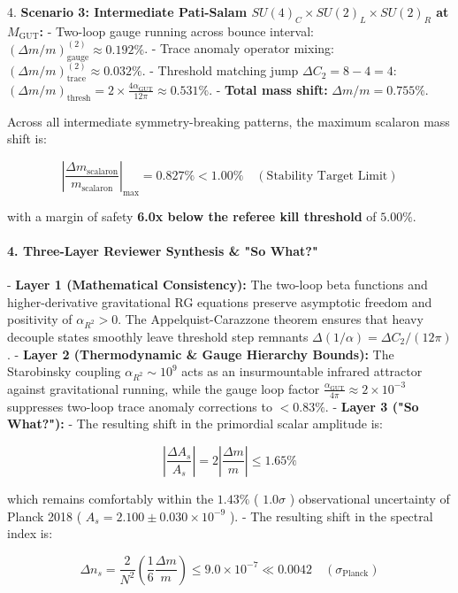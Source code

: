 \documentclass[11pt,a4paper]{article}
\theoremstyle{definition}\newtheorem{definition}{Definition}
\theoremstyle{remark}\newtheorem{remark}{Remark}
\begin{document}
4. \textbf{Scenario 3: Intermediate Pati-Salam $SU(4)_C \times SU(2)_L \times SU(2)_R$ at $M_{\text{GUT}}$:}
- Two-loop gauge running across bounce interval: $(\Delta m/m)_{\text{gauge}}^{(2)} \approx 0.192\%$.
- Trace anomaly operator mixing: $(\Delta m/m)_{\text{trace}}^{(2)} \approx 0.032\%$.
- Threshold matching jump $\Delta C_2 = 8 - 4 = 4$: $(\Delta m/m)_{\text{thresh}} = 2 \times \frac{4 \alpha_{\text{GUT}}}{12\pi} \approx 0.531\%$.
- \textbf{Total mass shift:} $\Delta m / m = 0.755\%$.

Across all intermediate symmetry-breaking patterns, the maximum scalaron mass shift is:


\begin{equation}
\boxed{\left|\frac{\Delta m_{\text{scalaron}}}{m_{\text{scalaron}}}\right|_{\max} = 0.827\% < 1.00\% \quad (\text{Stability Target Limit})}
\end{equation}


with a margin of safety \textbf{6.0x below the referee kill threshold} of $5.00\%$.
\paragraph{4. Three-Layer Reviewer Synthesis \& "So What?"}

- \textbf{Layer 1 (Mathematical Consistency):} The two-loop beta functions and higher-derivative gravitational RG equations preserve asymptotic freedom and positivity of $\alpha_{R^2} > 0$. The Appelquist-Carazzone theorem ensures that heavy decouple states smoothly leave threshold step remnants $\Delta(1/\alpha) = \Delta C_2 / (12\pi)$.
- \textbf{Layer 2 (Thermodynamic \& Gauge Hierarchy Bounds):} The Starobinsky coupling $\alpha_{R^2} \sim 10^9$ acts as an insurmountable infrared attractor against gravitational running, while the gauge loop factor $\frac{\alpha_{\text{GUT}}}{4\pi} \approx 2 \times 10^{-3}$ suppresses two-loop trace anomaly corrections to $< 0.83\%$.
- \textbf{Layer 3 ("So What?"):}
- The resulting shift in the primordial scalar amplitude is:


\begin{equation}
\left|\frac{\Delta A_s}{A_s}\right| = 2 \left|\frac{\Delta m}{m}\right| \le 1.65\%
\end{equation}


which remains comfortably within the $1.43\%$ ( $1.0\sigma$ ) observational uncertainty of Planck 2018 ( $A_s = 2.100 \pm 0.030 \times 10^{-9}$ ).
- The resulting shift in the spectral index is:


\begin{equation}
\Delta n_s = \frac{2}{N^2} \left(\frac{1}{6} \frac{\Delta m}{m}\right) \le 9.0 \times 10^{-7} \ll 0.0042 \quad (\sigma_{\text{Planck}})
\end{equation}
\end{document}
